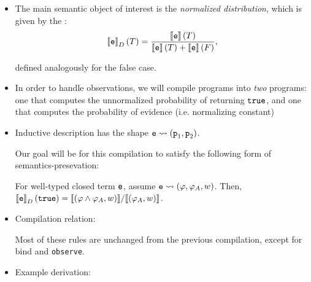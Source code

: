 \documentclass{tufte-handout}
\begin{document}
\begin{itemize}
\item  The main semantic object of interest is 
the \emph{normalized distribution}, which is given by the :
\begin{align*}
\left \llbracket {\texttt{e}} \right \rrbracket_D(T) = \frac{\left \llbracket {\texttt{e}} \right \rrbracket(T)}{\left \llbracket {\texttt{e}} \right \rrbracket(T) + \left \llbracket {\texttt{e}} \right \rrbracket(F) },
\end{align*}


defined analogously for the false case.
  \item In order to handle observations, we will compile \disc{} programs into 
  \emph{two} \prop{} programs: one that computes the unnormalized probability of 
  returning $\texttt{true}$, and one that computes the probability of evidence (i.e. normalizing constant)
  \item Inductive description has the shape $\texttt{e} \rightsquigarrow (\texttt{p}_1, \texttt{p}_2)$. 

  Our goal will be for this compilation to satisfy the following form of semantics-presevation:
  \begin{theorem}
    For well-typed closed term $\texttt{e}$,
    assume $\texttt{e} \rightsquigarrow (\varphi, \varphi_A, w)$. Then, 
    $\left \llbracket {\texttt{e}} \right \rrbracket_D(\texttt{true}) = {\left \llbracket {(\varphi \land \varphi_A, w)} \right \rrbracket} / {\left \llbracket {(\varphi_A, w)} \right \rrbracket}$.
  \end{theorem}

  \item Compilation relation:

  Most of these rules are unchanged from the previous compilation, except for bind and \texttt{observe}.

  \item Example derivation:
  

\end{itemize}
\end{document}
